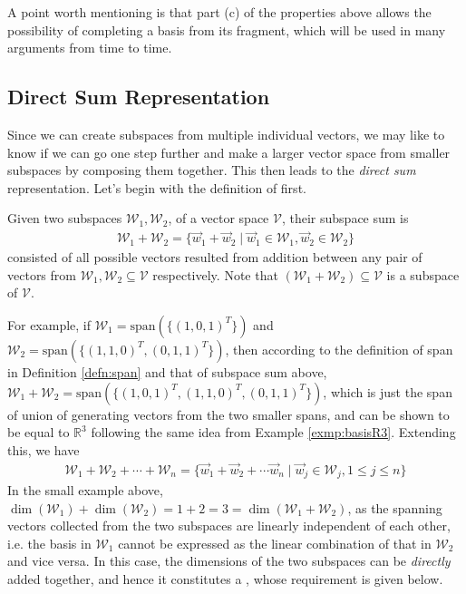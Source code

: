 A point worth mentioning is that part (c) of the properties above allows the possibility of completing a basis from its fragment, which will be used in many arguments from time to time.

\subsection{Direct Sum Representation}

Since we can create subspaces from multiple individual vectors, we may like to know if we can go one step further and make a larger vector space from smaller subspaces by composing them together. This then leads to the \textit{direct sum} representation. Let's begin with the definition of  first.
\begin{defn}
\label{defn:subspacesum}
Given two subspaces $\mathcal{W}_1, \mathcal{W}_2$, of a vector space $\mathcal{V}$, their subspace sum is
\begin{align*}
\mathcal{W}_1 + \mathcal{W}_2 = \{\vec{w}_1 + \vec{w}_2 \mid \vec{w}_1 \in \mathcal{W}_1, \vec{w}_2 \in \mathcal{W}_2\}    
\end{align*}
consisted of all possible vectors resulted from addition between any pair of vectors from $\mathcal{W}_1, \mathcal{W}_2 \subseteq \mathcal{V}$ respectively. Note that $(\mathcal{W}_1 + \mathcal{W}_2) \subseteq \mathcal{V}$ is a subspace of $\mathcal{V}$.
\end{defn}
For example, if $\mathcal{W}_1 = \text{span}(\{(1,0,1)^T\})$ and $\mathcal{W}_2 = \text{span}(\{(1,1,0)^T, (0,1,1)^T\})$, then according to the definition of span in Definition \ref{defn:span} and that of subspace sum above, $\mathcal{W}_1 + \mathcal{W}_2 = \text{span}(\{(1,0,1)^T, (1,1,0)^T, (0,1,1)^T\})$, which is just the span of union of generating vectors from the two smaller spans, and can be shown to be equal to $\mathbb{R}^3$ following the same idea from Example \ref{exmp:basisR3}. Extending this, we have
\begin{align*}
\mathcal{W}_1 + \mathcal{W}_2 + \cdots + \mathcal{W}_n = \{\vec{w}_1 + \vec{w}_2 + \cdots \vec{w}_n \mid \vec{w}_j \in \mathcal{W}_j, 1 \leq j \leq n\}    
\end{align*}
In the small example above, $\dim(\mathcal{W}_1) + \dim(\mathcal{W}_2) = 1 + 2 = 3 = \dim(\mathcal{W}_1 + \mathcal{W}_2)$, as the spanning vectors collected from the two subspaces are linearly independent of each other, i.e. the basis in $\mathcal{W}_1$ cannot be expressed as the linear combination of that in $\mathcal{W}_2$ and vice versa. In this case, the dimensions of the two subspaces can be \textit{directly} added together, and hence it constitutes a , whose requirement is given below.
